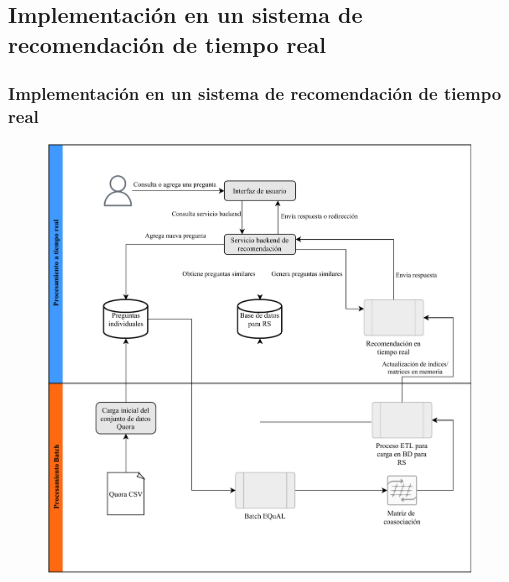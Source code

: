 \subsection{Implementación en un sistema de recomendación de tiempo real}
\begin{frame}
	\frametitle{Implementación en un sistema de recomendación de tiempo real}
	\begin{figure}
		\centering
		\includegraphics[width=0.55\linewidth]{4_problema_investigacion/implementacion_rs}
		\label{fig:implementacionrs}
	\end{figure}
\end{frame}